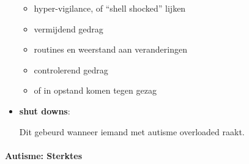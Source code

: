 \documentclass{article}
\begin{document}
\begin{itemize}
                            \begin{itemize}
                                \item hyper-vigilance, of “shell shocked” lijken
                                \item vermijdend gedrag
                                \item routines en weerstand aan veranderingen
                                \item controlerend gedrag
                                \item of in opstand komen tegen gezag
                            \end{itemize}
                        
                        \item \textbf{shut downs}\cite{autisme-shutdowns}: 
                        
                            Dit gebeurd wanneer iemand met autisme overloaded raakt.
                            
                    \end{itemize}
                
                \bigskip\noindent\paragraph{Autisme: Sterktes}
\end{document}
